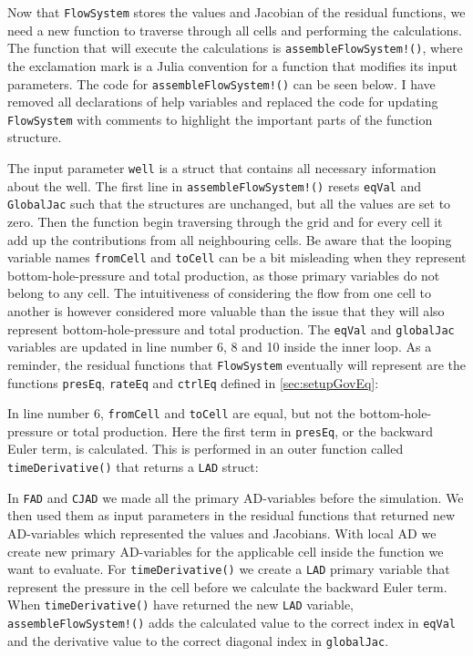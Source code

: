 Now that \texttt{FlowSystem} stores the  values and Jacobian of the residual functions, we need a new function to traverse through all cells and performing the calculations. The function that will execute the calculations is \texttt{assembleFlowSystem!()}, where the exclamation mark is a Julia convention for a function that modifies its input parameters. The code for \texttt{assembleFlowSystem!()} can be seen below. I have removed all declarations of help variables and replaced the code for updating \texttt{FlowSystem} with comments to highlight the important parts of the function structure.
\lstset{numbers=left}

\lstset{numbers=none}
The input parameter \texttt{well} is a struct that contains all necessary information about the well. The first line in \texttt{assembleFlowSystem!()} resets \texttt{eqVal} and \texttt{GlobalJac} such that the structures are unchanged, but all the values are set to zero. Then the function begin traversing through the grid and for every cell it add up the contributions from all neighbouring cells. Be aware that the looping variable names \texttt{fromCell} and \texttt{toCell} can be a bit misleading when they represent bottom-hole-pressure and total production, as those primary variables do not belong to any cell. The intuitiveness of considering the flow from one cell to another is however considered more valuable than the issue that they will also represent bottom-hole-pressure and total production. The \texttt{eqVal} and \texttt{globalJac} variables are updated in line number 6, 8 and 10 inside the inner loop. As a reminder, the residual functions that \texttt{FlowSystem} eventually will represent are the functions \texttt{presEq}, \texttt{rateEq} and \texttt{ctrlEq} defined in \autoref{sec:setupGovEq}:

In line number 6, \texttt{fromCell} and \texttt{toCell} are equal, but not the bottom-hole-pressure or total production. Here the first term in \texttt{presEq}, or the backward Euler term, is calculated. This is performed in an outer function called \texttt{timeDerivative()} that returns a \texttt{LAD} struct:

In \texttt{FAD} and \texttt{CJAD} we made all the primary AD-variables before the simulation. We then used them as input parameters in the residual functions that returned new AD-variables which represented the values and Jacobians. With local AD we create new primary AD-variables for the applicable cell inside the function we want to evaluate. For \texttt{timeDerivative()} we create a \texttt{LAD} primary variable that represent the pressure in the cell before we calculate the backward Euler term. When \texttt{timeDerivative()} have returned the new \texttt{LAD} variable, \texttt{assembleFlowSystem!()} adds the calculated value to the correct index in \texttt{eqVal} and the derivative value to the correct diagonal index in \texttt{globalJac}.


